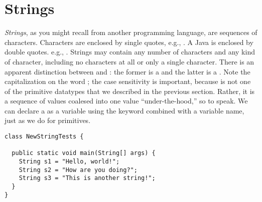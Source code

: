 \section{Strings}

\emph{Strings}, as you might recall from another programming language, are sequences of characters. 
Characters are enclosed by single quotes, e.g., . 
A Java  is enclosed by double quotes. e.g., . 
Strings may contain any number of characters and any kind of character, including no characters at all or only a single character. 
There is an apparent distinction between  and : the former is a  and the latter is a . 
Note the capitalization on the word ; the case sensitivity is important, because  is not one of the primitive datatypes that we described in the previous section. 
Rather, it is a sequence of  values coalesed into one value ``under-the-hood,'' so to speak. 
We can declare a  as a variable using the keyword combined with a variable name, just as we do for primitives. 

\begin{lstlisting}[language=MyJava]
class NewStringTests {

  public static void main(String[] args) {
    String s1 = "Hello, world!";
    String s2 = "How are you doing?";
    String s3 = "This is another string!";
  }
}
\end{lstlisting}

